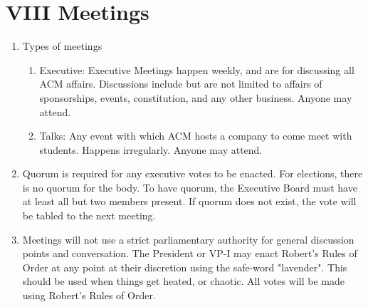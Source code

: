 
\section{VIII \textendash{} Meetings}
\begin{enumerate}
  \item	Types of meetings
    \begin{enumerate}
      \item Executive: Executive Meetings happen weekly, and are for discussing
      all ACM affairs. Discussions include but are not limited to affairs of
      sponsorships, events, constitution, and any other business. Anyone may attend.
      \item	Talks: Any event with which ACM hosts a company to come meet with
      students. Happens irregularly. Anyone may attend.
    \end{enumerate}
  \item Quorum is required for any executive votes to be enacted. For elections,
  there is no quorum for the body. To have quorum, the Executive Board must have
  at least all but two members present. If quorum does not exist, the vote will
  be tabled to the next meeting.
  \item Meetings will not use a strict parliamentary authority for general
  discussion points and conversation. The President or VP-I may enact Robert's
  Rules of Order at any point at their discretion using the safe-word
  "lavender". This should be used when things get heated, or chaotic. All votes
  will be made using Robert’s Rules of Order.
\end{enumerate}
